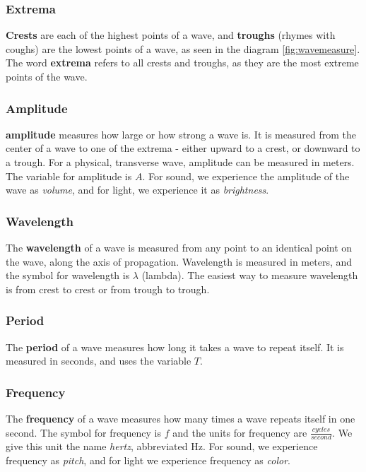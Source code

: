 	\subsubsection{Extrema}     
	
	\textbf{Crests} are each of the highest points of a wave, and \textbf{troughs} (rhymes with coughs) are the lowest points of a wave, as seen in the diagram \ref{fig:wavemeasure}.  The word \textbf{extrema} refers to all crests and troughs, as they are the most extreme points of the wave. 
	
	\subsubsection{Amplitude}   \textbf{\gls{amplitude}} measures how large or how strong a wave is.  It is measured from the center of a wave to one of the extrema - either upward to a crest, or downward to a trough.  For a physical, transverse wave, amplitude can be measured in meters.  The variable for amplitude is $A$.  For sound, we experience the amplitude of the wave as \textit{volume}, and for light, we experience it as \textit{brightness}.
	
	\subsubsection{Wavelength} 
	The \textbf{\gls{wavelength}} of a wave is measured from any point to an identical point on the wave, along the axis of propagation.  Wavelength is measured in meters, and the symbol for wavelength is $\lambda$ (lambda).  The easiest way to measure wavelength is from crest to crest or from trough to trough. 
	
	\subsubsection{Period}  
	The \textbf{\gls{period}} of a wave measures how long it takes a wave to repeat itself.  It is measured in seconds, and uses the variable $T$.  
	
	\subsubsection{Frequency}  
	The \textbf{\gls{frequency}} of a wave measures how many times a wave repeats itself in one second.  The symbol for frequency is $f$ and the units for frequency are $\frac{cycles}{second} $.  We give this unit the name \textit{hertz}, abbreviated Hz. For sound, we experience frequency as \textit{pitch}, and for light we experience frequency as \textit{color}. 
	
